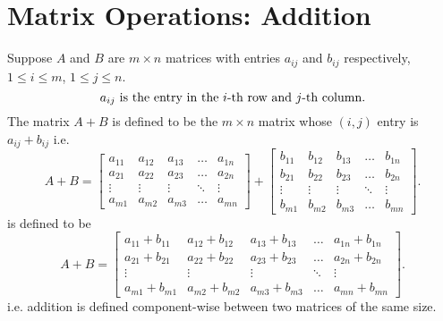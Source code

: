 \documentclass{report}
\begin{document}
\section{ Matrix Operations: Addition}
 Suppose $ A$ and $ B$ are $ m \times  n$         matrices with entries $ a_{ i j}$ and $ b _{ i j }$ respectively, $ 1 \leq i \leq m$, $ 1 \leq j \leq n$. 
 \[
   a_{ij} \text{ is the entry in the $ i$-th row and $ j$-th column}
 .\] 
 The matrix $ A+B$ is defined to be the $ m \times  n$ matrix whose $ (i,j) $ entry is $ a_{ij}+ b _{ij}$ i.e. \[
 A+B =  \begin{bmatrix}
     a_{11} & a_{12} & a_{ 1 3} & \dots  & a_{1n} \\
     a_{21} & a_{ 2 2} & a_{ 2 3} & \dots  & a_{2n} \\
     \vdots & \vdots & \vdots & \ddots & \vdots \\
     a_{ m 1} & a_{m 2} & a_{ m 3} & \dots  & a_{mn}\end{bmatrix}  +   \begin{bmatrix}
     b_{11} & b_{12} & b_{ 1 3} & \dots  & b_{1n} \\
     b_{21} & b_{ 2 2} & b_{ 2 3} & \dots  & b_{2n} \\
     \vdots & \vdots & \vdots & \ddots & \vdots \\
     b_{ m 1} & b_{m 2} & b_{ m 3} & \dots  & b_{mn}\end{bmatrix}  
 .\]   is defined to be 
 \[
  A+B = \begin{bmatrix}
      a_{11} + b_{11} & a_{12} + b_{12} & a_{ 1 3} + b_{ 1 3} & \dots  & a_{1n} + b_{1n} \\
      a_{21} + b_{21} & a_{ 2 2} + b_{ 2 2} & a_{ 2 3} + b_{ 2 3} & \dots  & a_{2n} + b_{2n} \\
      \vdots & \vdots & \vdots & \ddots & \vdots \\
      a_{ m 1} + b_{ m 1} & a_{m 2} + b_{m 2} & a_{ m 3} + b_{ m 3} & \dots  & a_{mn}+b _{mn}\end{bmatrix}
 .\]  i.e.  addition is defined component-wise between two matrices of the same size.\\
\end{document}
